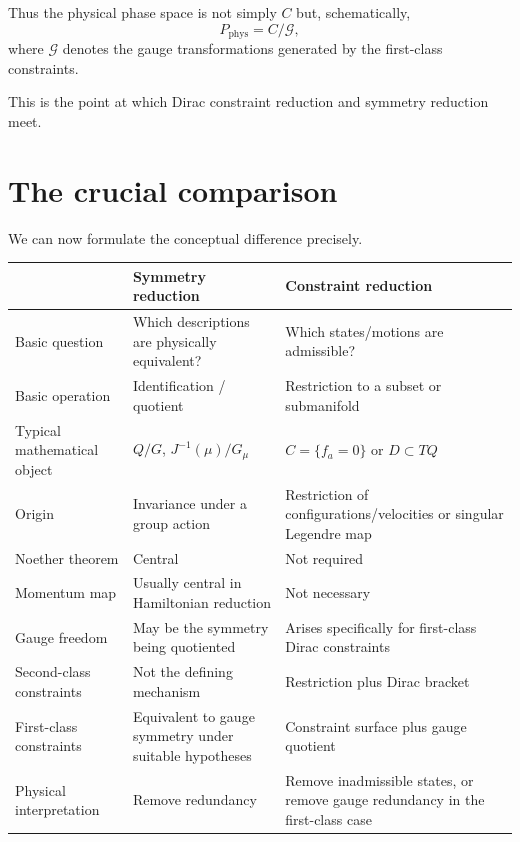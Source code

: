 \documentclass[11pt,a4paper]{article}
\theoremstyle{definition}
\begin{document}
Thus the physical phase space is not simply $C$ but, schematically,
\[
        P_{\mathrm{phys}}
        =
        C/\mathcal G,
\]
where $\mathcal G$ denotes the gauge transformations generated by the
first-class constraints.

This is the point at which Dirac constraint reduction and symmetry reduction
meet.

\section{The crucial comparison}

We can now formulate the conceptual difference precisely.

\begin{center}
\begin{tabular}{p{}p{}p{}}
\toprule
& \textbf{Symmetry reduction} & \textbf{Constraint reduction}\\
\midrule
Basic question &
Which descriptions are physically equivalent? &
Which states/motions are admissible?\\
\addlinespace
Basic operation &
Identification / quotient &
Restriction to a subset or submanifold\\
\addlinespace
Typical mathematical object &
$Q/G$, $J^{-1}(\mu)/G_\mu$ &
$C=\{f_a=0\}$ or $D\subset TQ$\\
\addlinespace
Origin &
Invariance under a group action &
Restriction of configurations/velocities or singular Legendre map\\
\addlinespace
Noether theorem &
Central &
Not required\\
\addlinespace
Momentum map &
Usually central in Hamiltonian reduction &
Not necessary\\
\addlinespace
Gauge freedom &
May be the symmetry being quotiented &
Arises specifically for first-class Dirac constraints\\
\addlinespace
Second-class constraints &
Not the defining mechanism &
Restriction plus Dirac bracket\\
\addlinespace
First-class constraints &
Equivalent to gauge symmetry under suitable hypotheses &
Constraint surface plus gauge quotient\\
\addlinespace
Physical interpretation &
Remove redundancy &
Remove inadmissible states, or remove gauge redundancy in the
first-class case\\
\bottomrule
\end{tabular}
\end{center}
\end{document}
